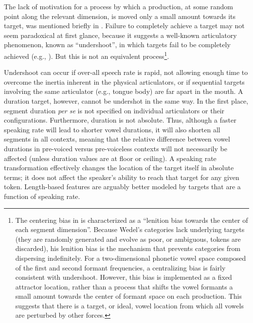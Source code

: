 The lack of motivation for a process by which a production, at some
random point along the relevant dimension, is moved only a small amount
towards its target, was mentioned briefly in .
Failure to completely achieve a target may not seem paradoxical at
first glance, because it suggests a well-known articulatory phenomenon,
known as “undershoot”, in which targets fail to be completely
achieved (e.g., \citealt{Lindblom1963}). But this is not an equivalent
process\footnote{The centering bias in \citet{Wedel2008} is characterized as a “lenition
bias towards the center of each segment dimension”. Because Wedel's
categories lack underlying targets (they are randomly generated and
evolve as poor, or ambiguous, tokens are discarded), his lenition
bias is the mechanism that prevents categories from dispersing indefinitely.
For a two-dimensional phonetic vowel space composed of the first and
second formant frequencies, a centralizing bias is fairly consistent
with undershoot. However, this bias is implemented as a fixed attractor
location, rather than a process that shifts the vowel formants a small
amount towards the center of formant space on each production. This
suggests that there is a target, or ideal, vowel location from which
all vowels are perturbed by other forces. }.

Undershoot can occur if over-all speech rate is rapid, not allowing
enough time to overcome the inertia inherent in the physical articulators,
or if sequential targets involving the same articulator (e.g., tongue
body) are far apart in the mouth. A duration target, however, cannot
be undershot in the same way. In the first place, segment duration
\emph{per se} is not specified on individual articulators or their
configurations. Furthermore, duration is not absolute. Thus, although
a faster speaking rate will lead to shorter vowel durations, it will
also shorten all segments in all contexts, meaning that the relative
difference between vowel durations in pre-voiced versus pre-voiceless
contexts will not necessarily be affected (unless duration values
are at floor or ceiling). A speaking rate transformation effectively
changes the location of the target itself in absolute terms; it does
not affect the speaker's ability to reach that target for any given
token. Length-based features are arguably better modeled by targets
that are a function of speaking rate. 

